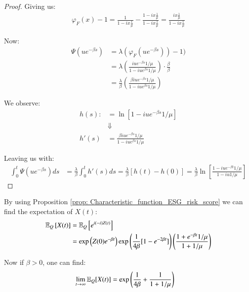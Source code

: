 \begin{proof}
Giving us:
\begin{align*}
\varphi_{F}(x) - 1
= 
\frac{1}{1-ix\frac{1}{\mu}} - \frac{1-ix\frac{1}{\mu}}{1-ix\frac{1}{\mu}} 
= 
\frac{ix\frac{1}{\mu}}{1-ix\frac{1}{\mu}}
\end{align*}

Now: 
\begin{align*}
\Psi(ue^{-\beta s}) &= \lambda(\varphi_{F}(ue^{-\beta s})) -1) \\ 
&= \lambda\left(
\frac{iue^{-\beta s}1/\mu}{1-iue^{\beta s}1/\mu}
\right)\cdot \frac{\beta}{\beta} \\ 
&= 
\frac{\lambda}{\beta}\left(
\frac{\beta iue^{-\beta s}1/\mu}{1-iue^{\beta s}1/\mu}
\right)
\end{align*}

\newpage 
We observe: 
\begin{align*}
h(s) :&= \ln[1-iue^{-\beta s}1/\mu] \\ 
&\Downarrow \\ 
h'(s) &= \frac{\beta iue^{-\beta s}1/\mu}{1-iue^{\beta s}1/\mu} 
\end{align*}

Leaving us with: 
\begin{align*}
\int_{0}^{t}\Psi(ue^{-\beta s})ds
&= 
\frac{\lambda}{\beta}\int_{0}^{t}h'(s)ds
= 
\frac{\lambda}{\beta}[h(t)-h(0)] 
= 
\frac{\lambda}{\beta}
\ln\left[
\frac{1-iue^{-\beta t}1/\mu}{1-iu1/\mu}
\right]
\end{align*}

\end{proof}


By using Proposition \ref{prop: Characteristic_function_ESG_risk_score} we can find the expectation of $X(t)$: 
\begin{align*}
\mathbb{E}_{Q}\left[X(t)\right]
&= 
\mathbb{E}_{Q}\left[
e^{i(-i)Z(t)}
\right] \\ 
&= 
\exp\left(
Z(0)e^{-\beta t}
\right)
\exp\left(
\frac{1}{4\beta}[1-e^{-2\beta t}]
\right)
\left(
\frac{
1 + e^{-\beta t}1/\mu
}{
1 + 1/\mu
}
\right)
\end{align*}

Now if $\beta > 0$, one can find: 
\begin{align*}
\lim\limits_{t \to \infty}\mathbb{E}_{Q}[X(t)]
&= 
\exp\left(
\frac{1}{4\beta} + \frac{1}{1+1/\mu}
\right)
\end{align*}


